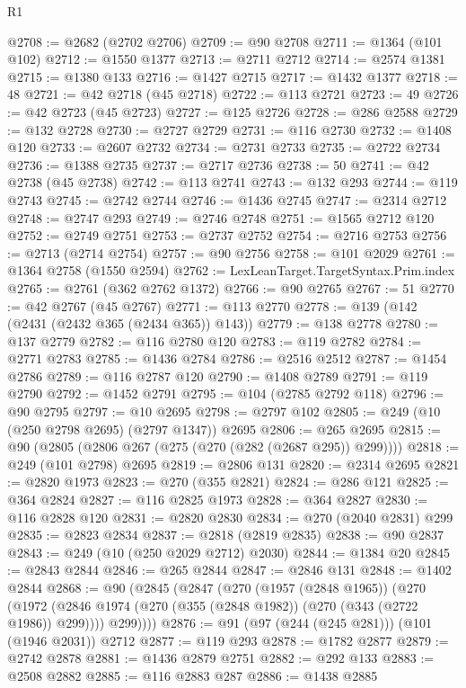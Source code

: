 \begin{lexlean}{R1}
\begin{coremodule}
@2708 := @2682 (@2702 @2706)
@2709 := @90 @2708
@2711 := @1364 (@101 @102)
@2712 := @1550 @1377
@2713 := @2711 @2712
@2714 := @2574 @1381
@2715 := @1380 @133
@2716 := @1427 @2715
@2717 := @1432 @1377
@2718 := 48
@2721 := @42 @2718 (@45 @2718)
@2722 := @113 @2721
@2723 := 49
@2726 := @42 @2723 (@45 @2723)
@2727 := @125 @2726
@2728 := @286 @2588
@2729 := @132 @2728
@2730 := @2727 @2729
@2731 := @116 @2730
@2732 := @1408 @120
@2733 := @2607 @2732
@2734 := @2731 @2733
@2735 := @2722 @2734
@2736 := @1388 @2735
@2737 := @2717 @2736
@2738 := 50
@2741 := @42 @2738 (@45 @2738)
@2742 := @113 @2741
@2743 := @132 @293
@2744 := @119 @2743
@2745 := @2742 @2744
@2746 := @1436 @2745
@2747 := @2314 @2712
@2748 := @2747 @293
@2749 := @2746 @2748
@2751 := @1565 @2712 @120
@2752 := @2749 @2751
@2753 := @2737 @2752
@2754 := @2716 @2753
@2756 := @2713 (@2714 @2754)
@2757 := @90 @2756
@2758 := @101 @2029
@2761 := @1364 @2758 (@1550 @2594)
@2762 := LexLeanTarget.TargetSyntax.Prim.index
@2765 := @2761 (@362 @2762 @1372)
@2766 := @90 @2765
@2767 := 51
@2770 := @42 @2767 (@45 @2767)
@2771 := @113 @2770
@2778 := @139 (@142 (@2431 (@2432 @365 (@2434 @365)) @143))
@2779 := @138 @2778
@2780 := @137 @2779
@2782 := @116 @2780 @120
@2783 := @119 @2782
@2784 := @2771 @2783
@2785 := @1436 @2784
@2786 := @2516 @2512
@2787 := @1454 @2786
@2789 := @116 @2787 @120
@2790 := @1408 @2789
@2791 := @119 @2790
@2792 := @1452 @2791
@2795 := @104 (@2785 @2792 @118)
@2796 := @90 @2795
@2797 := @10 @2695
@2798 := @2797 @102
@2805 := @249 (@10 (@250 @2798 @2695) (@2797 @1347)) @2695
@2806 := @265 @2695
@2815 := @90 (@2805 (@2806 @267 (@275 (@270 (@282 (@2687 @295)) @299))))
@2818 := @249 (@101 @2798) @2695
@2819 := @2806 @131
@2820 := @2314 @2695
@2821 := @2820 @1973
@2823 := @270 (@355 @2821)
@2824 := @286 @121
@2825 := @364 @2824
@2827 := @116 @2825 @1973
@2828 := @364 @2827
@2830 := @116 @2828 @120
@2831 := @2820 @2830
@2834 := @270 (@2040 @2831) @299
@2835 := @2823 @2834
@2837 := @2818 (@2819 @2835)
@2838 := @90 @2837
@2843 := @249 (@10 (@250 @2029 @2712) @2030)
@2844 := @1384 @20
@2845 := @2843 @2844
@2846 := @265 @2844
@2847 := @2846 @131
@2848 := @1402 @2844
@2868 := @90
    (@2845
      (@2847
        (@270
          (@1957 (@2848 @1965))
          (@270
            (@1972 (@2846 @1974 (@270 (@355 (@2848 @1982)) (@270 (@343 (@2722 @1986)) @299))))
            @299))))
@2876 := @91 (@97 (@244 (@245 @281))) (@101 (@1946 @2031)) @2712
@2877 := @119 @293
@2878 := @1782 @2877
@2879 := @2742 @2878
@2881 := @1436 @2879 @2751
@2882 := @292 @133
@2883 := @2508 @2882
@2885 := @116 @2883 @287
@2886 := @1438 @2885

\end{coremodule}
\end{lexlean}
